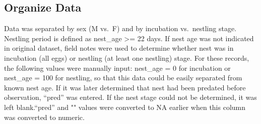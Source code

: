 \documentclass[]{article}
\begin{document}
\hypertarget{organize-data}{%
\subsection{Organize Data}\label{organize-data}}

Data was separated by sex (M vs.~F) and by incubation vs.~nestling
stage. Nestling period is defined as nest\_age \textgreater{}= 22 days.
If nest age was not indicated in original dataset, field notes were used
to determine whether nest was in incubation (all eggs) or nestling (at
least one nestling) stage. For these records, the following values were
manually input: nest\_age = 0 for incubation or nest\_age = 100 for
nestling, so that this data could be easily separated from known nest
age. If it was later determined that nest had been predated before
observation, ``pred'' was entered. If the nest stage could not be
determined, it was left blank.``pred'' and "" values were converted to
NA earlier when this column was converted to numeric.
\end{document}
